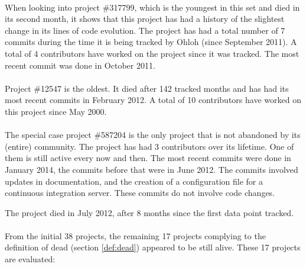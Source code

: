 \paragraph{}
When looking into project \#317799, which is the youngest in this set and died
in its second month, it shows that this project has had a history of the slightest
change in its lines of code evolution. The project has had a total number of 7
commits during the time it is being tracked by Ohloh (since September 2011). A
total of 4 contributors have worked on the project since it was tracked. The
most recent commit was done in October 2011.

\paragraph{}
Project \#12547 is the oldest. It died after 142 tracked months and has
had its most recent commits in February 2012. A total of 10 contributors have
worked on this project since May 2000.

\paragraph{}
The special case project \#587204 is the only project that is not abandoned by
its (entire) community. The project has had 3 contributors over its lifetime.
One of them is still active every now and then. The most recent commits were
done in January 2014, the commits before that were in June 2012.
The commits involved updates in documentation, and the creation of a
configuration file for a continuous integration server. These commits do not
involve code changes.

The project died in July 2012, after 8 months since the first data point
tracked.

\paragraph{}
From the initial 38 projects, the remaining 17 projects complying to the
definition of dead (section \ref{def:dead}) appeared to be still alive. These
17 projects are evaluated:

